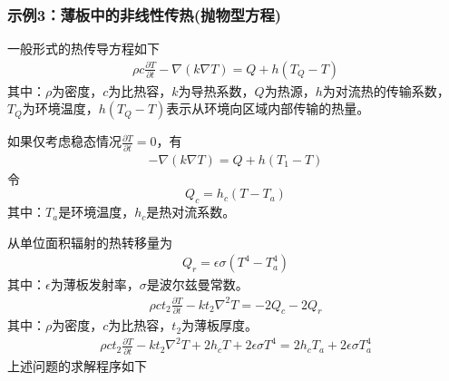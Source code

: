         \subsubsection{示例3：薄板中的非线性传热(抛物型方程)}
            \par
            一般形式的热传导方程如下
            \begin{align*}
                \rho c \frac{\partial T}{\partial t} - \nabla(k \nabla T) = Q + h(T_Q - T)
            \end{align*}
            其中：$\rho$为密度，$c$为比热容，$k$为导热系数，$Q$为热源，$h$为对流热的传输系数，$T_Q$为环境温度，$h(T_Q - T)$表示从环境向区域内部传输的热量。
            \par
            如果仅考虑稳态情况$\frac{\partial T}{\partial t} = 0$，有
            \begin{align*}
            - \nabla (k\nabla T) = Q +h(T_1- T)
            \end{align*}
            令
            \[
            Q_c = h_c(T - T_a)
            \]
            其中：$T_a$是环境温度，$h_c$是热对流系数。
            \par
            从单位面积辐射的热转移量为
            \begin{align*}
                Q_r = \epsilon \sigma (T^4 - T_a^4)
            \end{align*}
            其中：$\epsilon$为薄板发射率，$\sigma$是波尔兹曼常数。
            \begin{align*}
                \rho c t_2\frac{\partial T}{\partial t} - kt_2\nabla^2 T = -2Q_c - 2Q_r
            \end{align*}
            其中：$\rho$为密度，$c$为比热容，$t_2$为薄板厚度。
            \begin{align*}
                \rho c t_2\frac{\partial T}{\partial t} - kt_2\nabla^2 T + 2 h_c T+2\epsilon \sigma T^4 = 2h_cT_a + 2\epsilon \sigma T_a^4
            \end{align*}
            上述问题的求解程序如下
